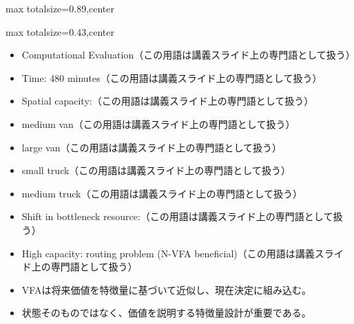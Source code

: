 \begin{minipage}[t]{0.58\textwidth}
\begin{adjustbox}{max totalsize={\textwidth}{0.89\textheight},center}
\begin{minipage}{\textwidth}
\end{minipage}
\end{adjustbox}
\end{minipage}


\clearpage
{}
\begin{minipage}[t]{0.405\textwidth}
\begin{adjustbox}{max totalsize={\textwidth}{0.43\textheight},center}
\begin{minipage}{\textwidth}\scriptsize
{}\begin{itemize}
\item Computational Evaluation（この用語は講義スライド上の専門語として扱う）
\item Time: 480 minutes（この用語は講義スライド上の専門語として扱う）
\item Spatial capacity:（この用語は講義スライド上の専門語として扱う）
\item medium van（この用語は講義スライド上の専門語として扱う）
\item large van（この用語は講義スライド上の専門語として扱う）
\item small truck（この用語は講義スライド上の専門語として扱う）
\item medium truck（この用語は講義スライド上の専門語として扱う）
\item Shift in bottleneck resource:（この用語は講義スライド上の専門語として扱う）
\item High capacity: routing problem (N-VFA beneficial)（この用語は講義スライド上の専門語として扱う）
\end{itemize}\begin{itemize}
\item VFAは将来価値を特徴量に基づいて近似し、現在決定に組み込む。
\item 状態そのものではなく、価値を説明する特徴量設計が重要である。
\end{itemize}
\end{minipage}
\end{adjustbox}
\end{minipage}\hfill
